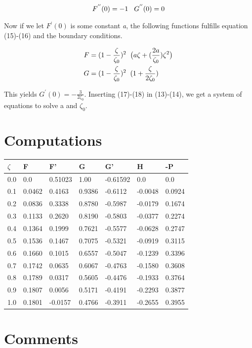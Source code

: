 \documentclass[a4paper,norsk]{article}
\begin{document}
\begin{align}
F^{''}(0) = -1 \hspace{3mm} G^{''}(0) = 0
\end{align}

Now if we let $F^{'}(0)$ is some constant \textit{a}, the following functions fulfills equation (15)-(16) and
the boundary conditions.

\begin{align}
F &= (1 - \frac{\zeta}{\zeta_0})^2 \hspace{2mm} \big(a\zeta + (\frac{2a}{\zeta_0}) \zeta^2 \big) \\
G &= (1 - \frac{\zeta}{\zeta_0} )^2 \hspace{2mm} (1 + \frac{\zeta}{2\zeta_0} )
\end{align}

This yields $G^{'}(0) = -\frac{3}{2 \zeta_0}$. Inserting (17)-(18) in (13)-(14), we get a system of
equations to solve a and $\zeta_0$.

\newpage
\section*{Computations}
\begin{center}
    \begin{tabular}{| l | l | l | l | l | l | p{5cm} |}
    \hline
    $\zeta$ & F & F' & G & G' & H & -P \\ \hline
    0.0 & 0.0 & 0.51023 & 1.00 & -0.61592 & 0.0 & 0.0 \\ \hline
	0.1 & 0.0462 & 0.4163 & 0.9386 & -0.6112 & -0.0048 & 0.0924 \\ \hline
	0.2 & 0.0836 & 0.3338 & 0.8780 & -0.5987 & -0.0179 & 0.1674 \\ \hline
	0.3 & 0.1133 & 0.2620 & 0.8190 & -0.5803 & -0.0377 & 0.2274 \\ \hline
	0.4 & 0.1364& 0.1999 & 0.7621 & -0.5577 & -0.0628 & 0.2747 \\ \hline
	0.5 & 0.1536& 0.1467 & 0.7075 & -0.5321 & -0.0919 & 0.3115 \\ \hline
	0.6 & 0.1660& 0.1015 & 0.6557 & -0.5047 & -0.1239 & 0.3396 \\ \hline
	0.7 & 0.1742& 0.0635 & 0.6067 & -0.4763 & -0.1580 & 0.3608 \\ \hline
	0.8 & 0.1789& 0.0317 & 0.5605 & -0.4476 & -0.1933 & 0.3764 \\ \hline
	0.9 & 0.1807& 0.0056 & 0.5171 & -0.4191 & -0.2293 & 0.3877 \\ \hline
	1.0 & 0.1801& -0.0157 & 0.4766 & -0.3911 & -0.2655 & 0.3955 \\ \hline
	\hline
    \end{tabular}
\end{center}


\section*{Comments}
\end{document}
